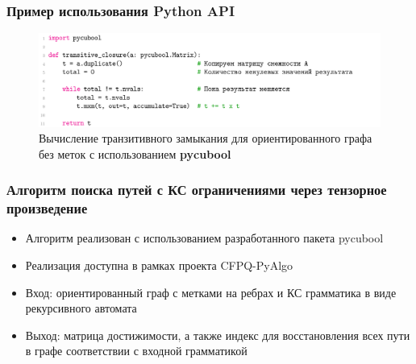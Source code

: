 \documentclass[aspectratio=169,xcolor=table,english]{beamer}
\begin{document}
\begin{frame}[fragile] \frametitle{Пример использования Python API}
    \begin{center}
     \begin{minipage}[m]{0.9\linewidth}
        \begin{figure}
            \centering
            \includegraphics[width=\textwidth]{figures/tc_python_api.png}
            \caption{Вычисление транзитивного замыкания для ориентированного графа без меток с использованием \textbf{pycubool}}
        \end{figure}
    \end{minipage}\hfill   
    \end{center}
\end{frame}

\begin{frame}[fragile] \frametitle{Алгоритм поиска путей с КС ограничениями через тензорное произведение}
    \begin{itemize}
        \item Алгоритм реализован с использованием разработанного пакета pycubool
        \item Реализация доступна в рамках проекта CFPQ-PyAlgo
        \item Вход: ориентированный граф с метками на ребрах и КС грамматика в виде рекурсивного автомата
        \item Выход: матрица достижимости, а также индекс для восстановления всех пути в графе соответствии с входной грамматикой
    \end{itemize}
\end{frame}
\end{document}
